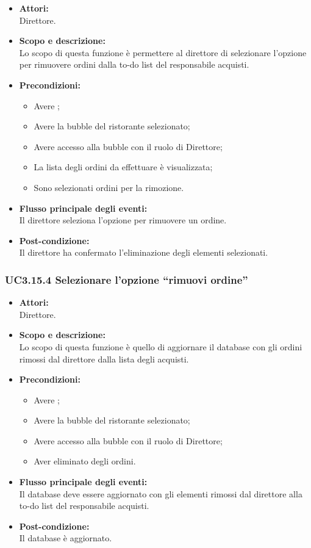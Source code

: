 \begin{itemize}
	\item \textbf{Attori:}
	\\Direttore.
	\item \textbf{Scopo e descrizione:} 
	\\Lo scopo di questa funzione è permettere al direttore di selezionare l’opzione per rimuovere ordini dalla to-do list del responsabile acquisti.
	\item \textbf{Precondizioni:}
	\begin{itemize}
		\item Avere ;
		\item Avere la bubble del ristorante selezionato;
		\item Avere accesso alla bubble con il ruolo di Direttore;
		\item La lista degli ordini da effettuare è visualizzata;
		\item Sono selezionati ordini per la rimozione.
	\end{itemize}
	\item \textbf{Flusso principale degli eventi:}
	\\Il direttore seleziona l’opzione per rimuovere un ordine.
	\item \textbf{Post-condizione:}
	\\Il direttore ha confermato l'eliminazione degli elementi selezionati.
\end{itemize}

\subsubsection{UC3.15.4 Selezionare l’opzione “rimuovi ordine”} \label{UC3.15.4}

\begin{itemize}
	\item \textbf{Attori:}
	\\Direttore.
	\item \textbf{Scopo e descrizione:} 
	\\Lo scopo di questa funzione è quello di aggiornare il database con gli ordini rimossi dal direttore dalla lista degli acquisti.
	\item \textbf{Precondizioni:}
	\begin{itemize}
		\item Avere ;
		\item Avere la bubble del ristorante selezionato;
		\item Avere accesso alla bubble con il ruolo di Direttore;
		\item Aver eliminato degli ordini.
	\end{itemize}
	\item \textbf{Flusso principale degli eventi:}
	\\Il database deve essere aggiornato con gli elementi rimossi dal direttore alla to-do list del responsabile acquisti.
	\item \textbf{Post-condizione:}
	\\Il database è aggiornato.
\end{itemize}
